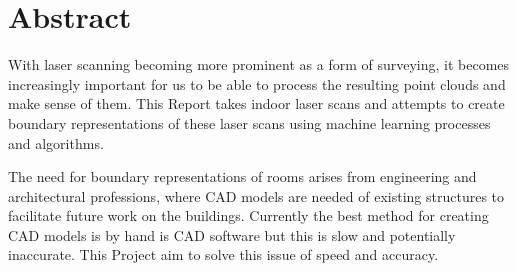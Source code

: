\chapter*{Abstract}


	With laser scanning becoming more prominent as a form of surveying, it becomes increasingly important for us to be able to process the resulting point clouds and make sense of them. This Report takes indoor laser scans and attempts to create boundary representations of these laser scans using machine learning processes and algorithms.
	
	The need for boundary representations of rooms arises from engineering and architectural professions, where CAD models are needed of existing structures to facilitate future work on the buildings. Currently the best method for creating CAD models is by hand is CAD software but this is slow and potentially inaccurate. This Project aim to solve this issue of speed and accuracy.